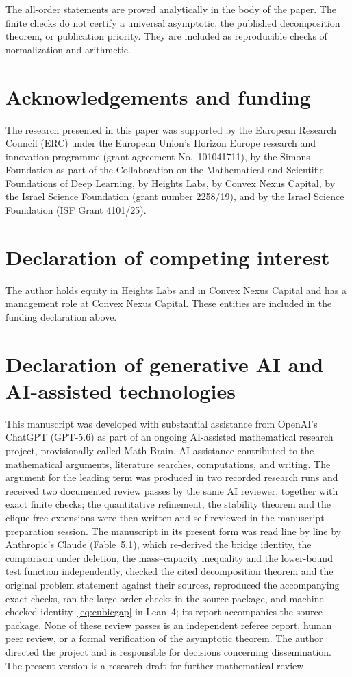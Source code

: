 \documentclass[11pt]{amsart}
\numberwithin{equation}{section}
\theoremstyle{definition}
\theoremstyle{remark}
\begin{document}
The all-order statements are proved analytically in the body of the paper. The finite checks do not certify a universal asymptotic, the published decomposition theorem, or publication priority. They are included as reproducible checks of normalization and arithmetic.

\section*{Acknowledgements and funding}
The research presented in this paper was supported by the European Research
Council (ERC) under the European Union's Horizon Europe research and
innovation programme (grant agreement No.~101041711), by the Simons
Foundation as part of the Collaboration on the Mathematical and Scientific
Foundations of Deep Learning, by Heights Labs, by Convex Nexus Capital, by
the Israel Science Foundation (grant number 2258/19), and by the Israel
Science Foundation (ISF Grant 4101/25).

\section*{Declaration of competing interest}
The author holds equity in Heights Labs and in Convex Nexus Capital and
has a management role at Convex Nexus Capital. These entities are included
in the funding declaration above.

\section*{Declaration of generative AI and AI-assisted technologies}
This manuscript was developed with substantial assistance from OpenAI's
ChatGPT (GPT-5.6) as part of an ongoing AI-assisted mathematical research
project, provisionally called Math Brain. AI assistance contributed to the
mathematical arguments, literature searches, computations, and writing.
The argument for the leading term was produced in two recorded research
runs and received two documented review passes by the same AI reviewer,
together with exact finite checks; the quantitative refinement, the
stability theorem and the clique-free extensions were then written and
self-reviewed in the manuscript-preparation session. The manuscript in its
present form was read line by line by Anthropic's Claude (Fable~5.1), which
re-derived the bridge identity, the comparison under deletion, the
mass--capacity inequality and the lower-bound test function independently,
checked the cited decomposition theorem and the original problem statement
against their sources, reproduced the accompanying exact checks, ran the
large-order checks in the source package, and machine-checked
identity~\eqref{eq:cubicgap} in Lean~4; its report accompanies the source
package. None of these review passes is an independent referee report,
human peer review, or a formal verification of the asymptotic theorem. The
author directed the project and is responsible for decisions concerning
dissemination. The present version is a research draft for further
mathematical review.
\end{document}
